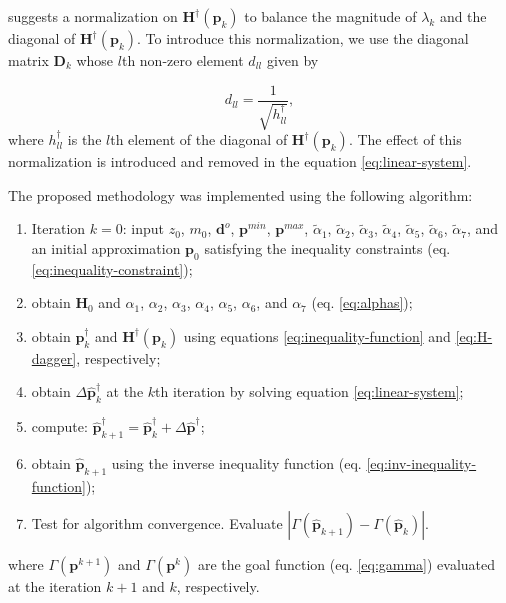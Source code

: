 \cite{marquardt_algorithm_1963} suggests a normalization on $\mathbf{H}^\dagger(\mathbf{p}_k)$ to balance the magnitude of $\lambda_k$ and the diagonal of $\mathbf{H}^\dagger(\mathbf{p}_k)$. To introduce this normalization, we use the diagonal matrix $\mathbf{D}_k$ whose $l$th non-zero element $d_{ll}$ given by

\begin{equation}\label{eq:D-matrix}
d_{ll} = \frac{1}{\sqrt{h^\dagger_{ll}}},
\end{equation}
where $h^\dagger_{ll}$ is the $l$th element of the diagonal of $\mathbf{H}^\dagger(\mathbf{p}_k)$. The effect of this normalization is introduced and removed in the equation \ref{eq:linear-system}. 

The proposed methodology was implemented using the following algorithm:

\begin{enumerate}
	\item Iteration $k = 0$: input $z_0$, $m_0$, $\mathbf{d}^o$, $\mathbf{p}^{min}$, $\mathbf{p}^{max}$, $\tilde{\alpha}_1$, $\tilde{\alpha}_2$, $\tilde{\alpha}_3$, $\tilde{\alpha}_4$, $\tilde{\alpha}_5$, $\tilde{\alpha}_6$, $\tilde{\alpha}_7$, and an initial approximation $\mathbf{p}_0$ satisfying the inequality constraints (eq. \ref{eq:inequality-constraint});
	\item obtain $\mathbf{H}_0$ and $\alpha_1$, $\alpha_2$, $\alpha_3$, $\alpha_4$, $\alpha_5$, $\alpha_6$, and $\alpha_7$ (eq. \ref{eq:alphas});
	\item obtain $\mathbf{p}^\dagger_k$ and $\mathbf{H}^\dagger(\mathbf{p}_k)$ using equations \ref{eq:inequality-function} and \ref{eq:H-dagger}, respectively;
	\item obtain $\Delta\hat{\mathbf{p}}^{\dagger}_k$ at the $k$th iteration by solving equation \ref{eq:linear-system};
	\item compute: $\hat{\mathbf{p}}_{k+1}^{\dagger} = \hat{\mathbf{p}}^{\dagger}_k + \Delta\hat{\mathbf{p}}^{\dagger}$;
	\item obtain $\hat{\mathbf{p}}_{k+1}$ using the inverse inequality function (eq. \ref{eq:inv-inequality-function});
	\item Test for algorithm convergence. Evaluate $\left|\Gamma(\hat{\mathbf{p}}_{k+1}) - \Gamma(\hat{\mathbf{p}}_k)\right|$.
\end{enumerate}
where  $ \Gamma(\mathbf{p}^{k+1}) $ and $\Gamma(\mathbf{p}^{k})$ are the goal function (eq. \ref{eq:gamma}) evaluated at the iteration $k+1$ and $k$, respectively.

